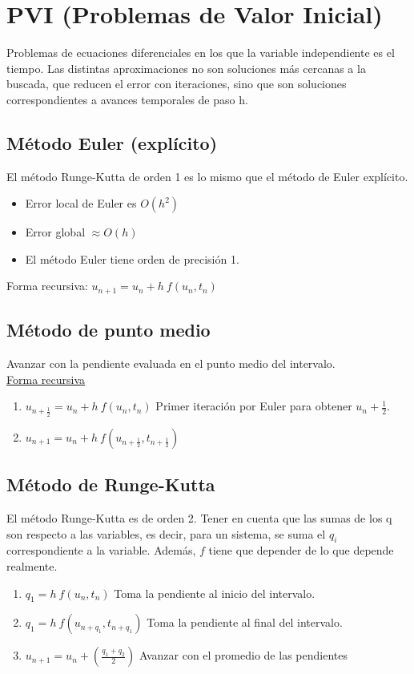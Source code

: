 \section{PVI (Problemas de Valor Inicial)}
Problemas de ecuaciones diferenciales en los que la variable independiente es el tiempo.
Las distintas aproximaciones no son soluciones más cercanas a la buscada, que reducen el error con iteraciones, sino que son soluciones correspondientes a avances temporales de paso h.
\subsection{Método Euler (explícito)}
El método Runge-Kutta de orden 1 es lo mismo que el método de Euler explícito.
\begin{itemize}
    \item Error local de Euler es $O(h^2)$
    \item Error global $\approx O(h)$
    \item El método Euler tiene orden de precisión 1.
\end{itemize}
Forma recursiva: $u_{n+1}=u_n+h\ f(u_n,t_n)$
\subsection{Método de punto medio}
Avanzar con la pendiente evaluada en el punto medio del intervalo.\\
\underline{Forma recursiva}\\
\begin{enumerate}
\item $u_{n+\frac{1}{2}}=u_n+h\ f(u_n,t_n)$ Primer iteración por Euler para obtener $u_n+\frac{1}{2}$.
\item $u_{n+1}=u_n+h\ f(u_{n+\frac{1}{2}},t_{n+\frac{1}{2}})$
\end{enumerate}
\subsection{Método de Runge-Kutta}
El método Runge-Kutta es de orden 2.
Tener en cuenta que las sumas de los q son respecto a las variables, es decir, para un sistema, se suma
el $q_i$ correspondiente a la variable. Además, $f$ tiene que depender de lo que depende realmente.
\begin{enumerate}
    \item $q_1=h\ f(u_n,t_n)$ Toma la pendiente al inicio del intervalo.
    \item $q_1=h\ f(u_{n+q_1},t_{n+q_1})$ Toma la pendiente al final del intervalo.
    \item $u_{n+1}=u_n+(\frac{q_1+q_2}{2})$ Avanzar con el promedio de las pendientes
\end{enumerate}
